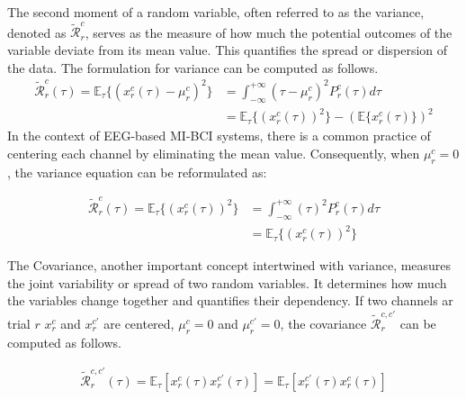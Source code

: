 \documentclass[runningheads]{llncs}
\newenvironment{reviewer}{\setcounter{pointcounter}{1}}{}
\newcommand{\changes}[1]{\textcolor[rgb]{1.00,0.00,0.00}{#1}}
\begin{document}
\begin{reviewer}
{        The second moment of a random variable, often referred to as the variance, denoted as \changes{$\mathcal{\tilde{R}}^{c}_{r}$}, serves as the measure of how much the potential outcomes of the variable deviate from its mean value. This quantifies the spread or dispersion of the data. The formulation for variance can be computed as follows.
        \changes{
        \begin{equation}
          \begin{split}
            \mathcal{\tilde{R}}^{c}_{r}(\tau) = \mathbb{E}_{\tau}\{(x^{c}_{r}(\tau) - \mu^{c}_{r})^2\} &= \int_{-\infty}^{+\infty} \left( \tau-\mu^{c}_{r} \right) ^2 P^{c}_{r}(\tau) d\tau \\
            &= \mathbb{E}_{\tau}\{(x^{c}_{r}(\tau))^2\} - (\mathbb{E}\{x^{c}_{r}(\tau)\})^2
          \end{split}
        \end{equation}
        }
        In the context of EEG-based MI-BCI systems, there is a common practice of centering each channel by eliminating the mean value. Consequently, when \changes{$\mu^{c}_{r}=0$}, the variance equation can be reformulated as:
        
        \changes{
        \begin{equation}
          \begin{split}
            \mathcal{\tilde{R}}^{c}_{r}(\tau) = \mathbb{E}_{\tau}\{(x^{c}_{r}(\tau))^2\} &= \int_{-\infty}^{+\infty}  (\tau)^2 P^{c}_{r}(\tau) d\tau \\
            &= \mathbb{E}_\tau\{(x^{c}_{r}(\tau))^2\}
          \end{split}
        \end{equation}
        }
        
        The Covariance, another important concept intertwined with variance, measures the joint variability or spread of two random variables. It determines how much the variables change together and quantifies their dependency. \changes{If two channels ar trial $r$ $x^{c}_{r}$ and $x^{c'}_{r}$ are centered, $\mu^{c}_{r}=0$ and $\mu^{c'}_{r}=0$, the covariance $\mathcal{\tilde{R}}^{c, c'}_{r}$} can be computed as follows.
        
        \changes{
        \begin{equation}
          \begin{split}
            \mathcal{\tilde{R}}^{c, c'}_{r}(\tau) = \mathbb{E}_{\tau} \left[ x^{c}_{r}(\tau) x^{c'}_{r}(\tau)  \right] = \mathbb{E}_{\tau} \left[ x^{c'}_{r}(\tau) x^{c}_{r}(\tau) \right] \label{corr_est}
          \end{split}
        \end{equation}
        }
        
}
\end{reviewer}
\end{document}
